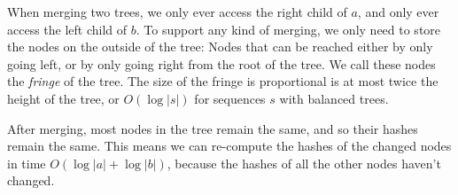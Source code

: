 When merging two trees, we only ever access the right child of $a$, and only
ever access the left child of $b$. To support any kind of merging, we only need
to store the nodes on the outside of the tree: Nodes that can be reached either
by only going left, or by only going right from the root of the tree. We call
these nodes the \emph{fringe} of the tree.  The size of the fringe is
proportional is at most twice the height of the tree, or $O(\log |s|)$ for
sequences $s$ with balanced trees.



After merging, most nodes in the tree remain the same, and so their hashes
remain the same. This means we can re-compute the hashes of the changed nodes
in time $O(\log |a| + \log |b|)$, because the hashes of all the other nodes
haven't changed.
